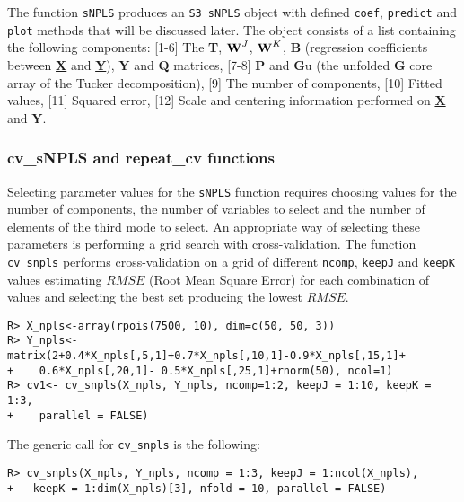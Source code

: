 The function \texttt{sNPLS} produces an \texttt{S3 sNPLS} object with defined \texttt{coef}, \texttt{predict} and \texttt{plot} methods that will be discussed later. The object consists of a list containing the following components: [1-6] The \textbf{T}, $\textbf{\text{W}}^{J}$, $\textbf{\text{W}}^{K}$, \textbf{B} (regression coefficients between \textbf{\underline{X}} and \textbf{\underline{Y}}), \textbf{Y} and \textbf{Q} matrices, [7-8] \textbf{P} and \textbf{G}u (the unfolded \textbf{G} core array of the Tucker decomposition), [9] The number of components, [10] Fitted values, [11] Squared error, [12] Scale and centering information performed on \textbf{\underline{X}} and \textbf{Y}.

\subsubsection{cv\_sNPLS and repeat\_cv functions}
Selecting parameter values for the \texttt{sNPLS} function requires choosing values for the number of components, the number of variables to select and the number of elements of the third mode to select. An appropriate way of selecting these parameters is performing a grid search with cross-validation. The function \texttt{cv\_snpls} performs cross-validation on a grid of different \texttt{ncomp}, \texttt{keepJ} and \texttt{keepK} values estimating $RMSE$ (Root Mean Square Error) for each combination of values and selecting the best set producing the lowest $RMSE$.

\begin{verbatim}
R> X_npls<-array(rpois(7500, 10), dim=c(50, 50, 3))
R> Y_npls<-matrix(2+0.4*X_npls[,5,1]+0.7*X_npls[,10,1]-0.9*X_npls[,15,1]+
+    0.6*X_npls[,20,1]- 0.5*X_npls[,25,1]+rnorm(50), ncol=1)
R> cv1<- cv_snpls(X_npls, Y_npls, ncomp=1:2, keepJ = 1:10, keepK = 1:3, 
+    parallel = FALSE)
\end{verbatim}

The generic call for \texttt{cv\_snpls} is the following:
\begin{verbatim}
R> cv_snpls(X_npls, Y_npls, ncomp = 1:3, keepJ = 1:ncol(X_npls),
+   keepK = 1:dim(X_npls)[3], nfold = 10, parallel = FALSE)
\end{verbatim}

